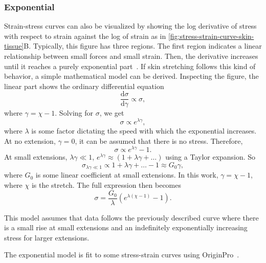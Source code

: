 \subsubsection{Exponential}
Strain-stress curves can also be visualized by showing the log derivative of stress with respect to strain against the log of strain as in \cref{fig:stress-strain-curve-skin-tissue}B.
Typically, this figure has three regions.
The first region indicates a linear relationship between small forces and small strain.
Then, the derivative increases until it reaches a purely exponential part~.
If skin stretching follows this kind of behavior, a simple mathematical model can be derived.
Inspecting the figure, the linear part shows the ordinary differential equation
\begin{equation}
    \frac{\mathrm{d}\sigma}{\mathrm{d}\gamma} \propto \sigma,
\end{equation}
where $\gamma = \chi - 1$.
Solving for $\sigma$, we get
\begin{equation}
    \sigma \propto e^{\lambda\gamma},
\end{equation}
where $\lambda$ is some factor dictating the speed with which the exponential increases.
At no extension, $\gamma=0$, it can be assumed that there is no stress.
Therefore,
\begin{equation}
    \sigma \propto e^{\lambda\gamma} - 1.
\end{equation}
At small extensions, $\lambda\gamma \ll 1$, $e^{\lambda\gamma} \approx (1 + \lambda\gamma + \ldots)$ using a Taylor expansion.
So
\begin{equation}
    \sigma_{\lambda\gamma\ll 1} \propto 1 + \lambda\gamma + \ldots - 1 \approx G_0 \gamma,
\end{equation}
where $G_0$ is some linear coefficient at small extensions.
In this work, $\gamma = \chi - 1$, where $\chi$ is the stretch.
The full expression then becomes
\begin{equation}\label{eq:exp}
    \sigma = \frac{G_0}{\lambda}\left(e^{\lambda(\chi - 1)}-1\right).
\end{equation}

This model assumes that data follows the previously described curve where there is a small rise at small extensions and an indefinitely exponentially increasing stress for larger extensions.

The exponential model is fit to some stress-strain curves using OriginPro~.

